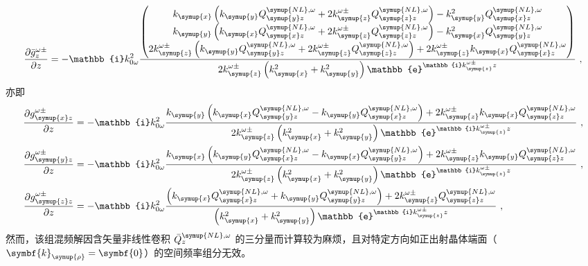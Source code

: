 \begin{equation} \label{eq:2-168}
	\displaystyle{\frac{\partial \bar{g}^{\omega\pm}_{z}}{\partial z}} = - \mathbb{i} k^{2}_{0\omega} \frac{ \begin{pmatrix} k_{\symup{x}} \left( k_{\symup{y}} Q^{{\symup{NL}},\omega}_{\symup{y} z} + 2 k^{\omega\pm}_{\symup{z}} Q^{{\symup{NL}},\omega}_{\symup{z} z} \right) - k^2_{\symup{y}} Q^{{\symup{NL}},\omega}_{\symup{x} z} \\ k_{\symup{y}} \left( k_{\symup{x}} Q^{{\symup{NL}},\omega}_{\symup{x} z} + 2 k^{\omega\pm}_{\symup{z}} Q^{{\symup{NL}},\omega}_{\symup{z} z} \right) - k^2_{\symup{x}} Q^{{\symup{NL}},\omega}_{\symup{y} z} \\ 2 k^{\omega\pm}_{\symup{z}} \left( k_{\symup{y}} Q^{{\symup{NL}},\omega}_{\symup{y} z} + 2 k^{\omega\pm}_{\symup{z}} Q^{{\symup{NL}},\omega}_{\symup{z} z} \right) + 2 k^{\omega\pm}_{\symup{z}} k_{\symup{x}} Q^{{\symup{NL}},\omega}_{\symup{x} z} \end{pmatrix} }{ 2 k^{\omega\pm}_{\symup{z}} \left( k^2_{\symup{x}} + k^2_{\symup{y}} \right) \mathbb{e}^{\mathbb{i} k^{\omega\pm}_{\symup{z}} z}} ~,
\end{equation}
亦即
\begin{subequations} \label{eq:2-169}
	\abovedisplayskip=10pt
	\belowdisplayskip=10pt
	\begin{align}
		\displaystyle{\frac{\partial g^{\omega\pm}_{\symup{x} z}}{\partial z}} &= - \mathbb{i} k^{2}_{0\omega} \frac{ k_{\symup{y}} \left( k_{\symup{x}} Q^{{\symup{NL}},\omega}_{\symup{y} z} - k_{\symup{y}} Q^{{\symup{NL}},\omega}_{\symup{x} z} \right) + 2 k^{\omega\pm}_{\symup{z}} k_{\symup{x}} Q^{{\symup{NL}},\omega}_{\symup{z} z} }{ 2 k^{\omega\pm}_{\symup{z}} \left( k^2_{\symup{x}} + k^2_{\symup{y}} \right) \mathbb{e}^{\mathbb{i} k^{\omega\pm}_{\symup{z}} z}} \label{eq:2-169a}~, \\ \displaystyle{\frac{\partial g^{\omega\pm}_{\symup{y} z}}{\partial z}} &= - \mathbb{i} k^{2}_{0\omega} \frac{ k_{\symup{x}} \left( k_{\symup{y}} Q^{{\symup{NL}},\omega}_{\symup{x} z} - k_{\symup{x}} Q^{{\symup{NL}},\omega}_{\symup{y} z} \right) + 2 k^{\omega\pm}_{\symup{z}} k_{\symup{y}} Q^{{\symup{NL}},\omega}_{\symup{z} z} }{ 2 k^{\omega\pm}_{\symup{z}} \left( k^2_{\symup{x}} + k^2_{\symup{y}} \right) \mathbb{e}^{\mathbb{i} k^{\omega\pm}_{\symup{z}} z}} \label{eq:2-169b}~, \\ \displaystyle{\frac{\partial g^{\omega\pm}_{\symup{z} z}}{\partial z}} &= - \mathbb{i} k^{2}_{0\omega} \frac{ \left( k_{\symup{x}} Q^{{\symup{NL}},\omega}_{\symup{x} z} + k_{\symup{y}} Q^{{\symup{NL}},\omega}_{\symup{y} z} \right) + 2 k^{\omega\pm}_{\symup{z}} Q^{{\symup{NL}},\omega}_{\symup{z} z} }{ \left( k^2_{\symup{x}} + k^2_{\symup{y}} \right) \mathbb{e}^{\mathbb{i} k^{\omega\pm}_{\symup{z}} z}} \label{eq:2-169c}~,
	\end{align}
\end{subequations}
然而，该组混频解因含矢量非线性卷积 $\bar{Q}^{{\symup{NL}},\omega}_{z}$ 的三分量而计算较为麻烦，且对特定方向如正出射晶体端面（$\symbf{k}_{\symup{\rho}} = \symbf{0}$）的空间频率组分无效。

